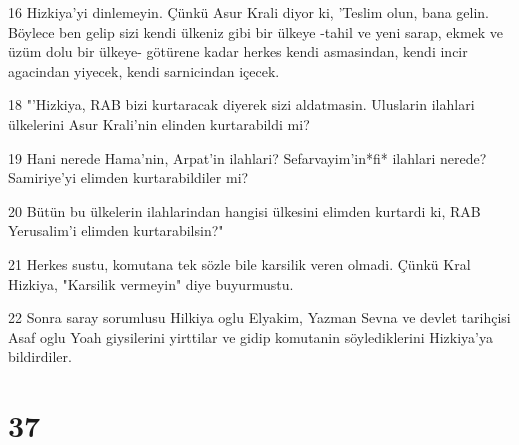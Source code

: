 \par 16 Hizkiya'yi dinlemeyin. Çünkü Asur Krali diyor ki, 'Teslim olun, bana gelin. Böylece ben gelip sizi kendi ülkeniz gibi bir ülkeye -tahil ve yeni sarap, ekmek ve üzüm dolu bir ülkeye- götürene kadar herkes kendi asmasindan, kendi incir agacindan yiyecek, kendi sarnicindan içecek.
\par 18 "'Hizkiya, RAB bizi kurtaracak diyerek sizi aldatmasin. Uluslarin ilahlari ülkelerini Asur Krali'nin elinden kurtarabildi mi?
\par 19 Hani nerede Hama'nin, Arpat'in ilahlari? Sefarvayim'in*fi* ilahlari nerede? Samiriye'yi elimden kurtarabildiler mi?
\par 20 Bütün bu ülkelerin ilahlarindan hangisi ülkesini elimden kurtardi ki, RAB Yerusalim'i elimden kurtarabilsin?"
\par 21 Herkes sustu, komutana tek sözle bile karsilik veren olmadi. Çünkü Kral Hizkiya, "Karsilik vermeyin" diye buyurmustu.
\par 22 Sonra saray sorumlusu Hilkiya oglu Elyakim, Yazman Sevna ve devlet tarihçisi Asaf oglu Yoah giysilerini yirttilar ve gidip komutanin söylediklerini Hizkiya'ya bildirdiler.

\chapter{37}


